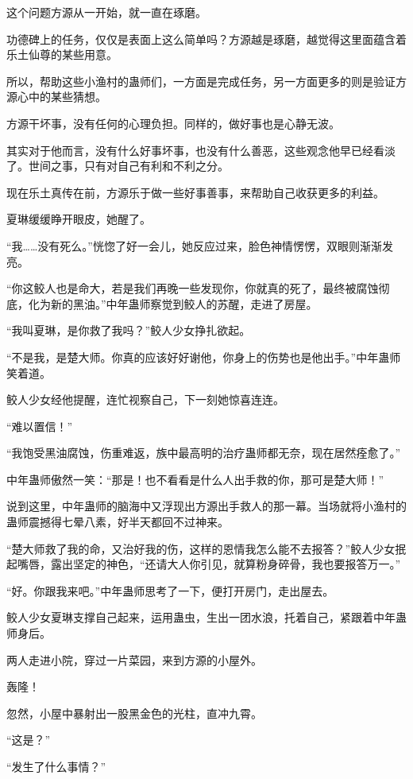 \begin{this_body}
这个问题方源从一开始，就一直在琢磨。

功德碑上的任务，仅仅是表面上这么简单吗？方源越是琢磨，越觉得这里面蕴含着乐土仙尊的某些用意。

所以，帮助这些小渔村的蛊师们，一方面是完成任务，另一方面更多的则是验证方源心中的某些猜想。

方源干坏事，没有任何的心理负担。同样的，做好事也是心静无波。

其实对于他而言，没有什么好事坏事，也没有什么善恶，这些观念他早已经看淡了。世间之事，只有对自己有利和不利之分。

现在乐土真传在前，方源乐于做一些好事善事，来帮助自己收获更多的利益。

夏琳缓缓睁开眼皮，她醒了。

“我……没有死么。”恍惚了好一会儿，她反应过来，脸色神情愣愣，双眼则渐渐发亮。

“你这鲛人也是命大，若是我们再晚一些发现你，你就真的死了，最终被腐蚀彻底，化为新的黑油。”中年蛊师察觉到鲛人的苏醒，走进了房屋。

“我叫夏琳，是你救了我吗？”鲛人少女挣扎欲起。

“不是我，是楚大师。你真的应该好好谢他，你身上的伤势也是他出手。”中年蛊师笑着道。

鲛人少女经他提醒，连忙视察自己，下一刻她惊喜连连。

“难以置信！”

“我饱受黑油腐蚀，伤重难返，族中最高明的治疗蛊师都无奈，现在居然痊愈了。”

中年蛊师傲然一笑：“那是！也不看看是什么人出手救的你，那可是楚大师！”

说到这里，中年蛊师的脑海中又浮现出方源出手救人的那一幕。当场就将小渔村的蛊师震撼得七晕八素，好半天都回不过神来。

“楚大师救了我的命，又治好我的伤，这样的恩情我怎么能不去报答？”鲛人少女抿起嘴唇，露出坚定的神色，“还请大人你引见，就算粉身碎骨，我也要报答万一。”

“好。你跟我来吧。”中年蛊师思考了一下，便打开房门，走出屋去。

鲛人少女夏琳支撑自己起来，运用蛊虫，生出一团水浪，托着自己，紧跟着中年蛊师身后。

两人走进小院，穿过一片菜园，来到方源的小屋外。

轰隆！

忽然，小屋中暴射出一股黑金色的光柱，直冲九霄。

“这是？”

“发生了什么事情？”


\end{this_body}
